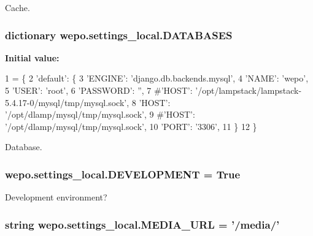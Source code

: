 Cache. 

\hypertarget{namespacewepo_1_1settings__local_a0ddad315e1cafe9c0abdddc17f245c32}{
\subsubsection[{D\-A\-T\-A\-B\-A\-S\-E\-S}]{\setlength{\rightskip}{0pt plus 5cm}dictionary wepo.\-settings\-\_\-local.\-D\-A\-T\-A\-B\-A\-S\-E\-S}}\label{namespacewepo_1_1settings__local_a0ddad315e1cafe9c0abdddc17f245c32}
{\bfseries Initial value\-:}
\begin{DoxyCode}
1 = \{
2    \textcolor{stringliteral}{'default'}: \{
3       \textcolor{stringliteral}{'ENGINE'}:   \textcolor{stringliteral}{'django.db.backends.mysql'},
4       \textcolor{stringliteral}{'NAME'}:     \textcolor{stringliteral}{'wepo'},
5       \textcolor{stringliteral}{'USER'}:     \textcolor{stringliteral}{'root'},
6       \textcolor{stringliteral}{'PASSWORD'}: \textcolor{stringliteral}{''},
7       \textcolor{comment}{#'HOST':     '/opt/lampstack/lampstack-5.4.17-0/mysql/tmp/mysql.sock',}
8       \textcolor{stringliteral}{'HOST'}:     \textcolor{stringliteral}{'/opt/dlamp/mysql/tmp/mysql.sock'},
9       \textcolor{comment}{#'HOST':     '/opt/dlamp/mysql/tmp/mysql.sock',}
10       \textcolor{stringliteral}{'PORT'}:     \textcolor{stringliteral}{'3306'},
11    \}
12 \}
\end{DoxyCode}


Database. 

\hypertarget{namespacewepo_1_1settings__local_ab901350a2926e04c72533eb35929e544}{
\subsubsection[{D\-E\-V\-E\-L\-O\-P\-M\-E\-N\-T}]{\setlength{\rightskip}{0pt plus 5cm}wepo.\-settings\-\_\-local.\-D\-E\-V\-E\-L\-O\-P\-M\-E\-N\-T = True}}\label{namespacewepo_1_1settings__local_ab901350a2926e04c72533eb35929e544}


Development environment? 

\hypertarget{namespacewepo_1_1settings__local_a1f16861da0c8d2a2e984d57e5ea2b784}{
\subsubsection[{M\-E\-D\-I\-A\-\_\-\-U\-R\-L}]{\setlength{\rightskip}{0pt plus 5cm}string wepo.\-settings\-\_\-local.\-M\-E\-D\-I\-A\-\_\-\-U\-R\-L = '/media/'}}\label{namespacewepo_1_1settings__local_a1f16861da0c8d2a2e984d57e5ea2b784}


